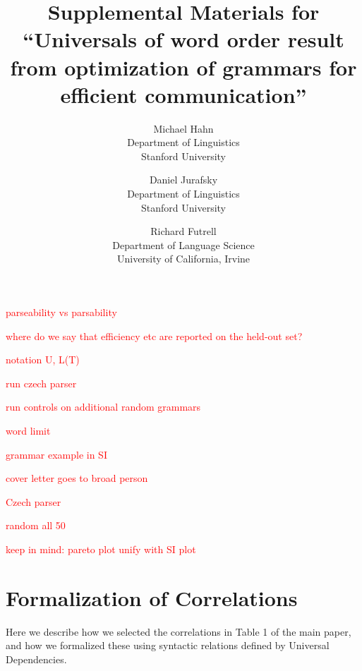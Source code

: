 \documentclass[10pt,twoside,lineno]{article}
\title{Supplemental Materials for ``Universals of word order result from optimization of grammars for efficient communication''}
\author{
        Michael Hahn \\
                Department of Linguistics\\
       Stanford University
            \and
       Daniel Jurafsky\\
       Department of Linguistics\\
       Stanford University \\
       \and
       Richard Futrell\\
       Department of Language Science\\
       University of California, Irvine
}
\begin{document}
\maketitle




\tableofcontents


\textcolor{red}{parseability vs parsability}

\textcolor{red}{where do we say that efficiency etc are reported on the held-out set?}

\textcolor{red}{notation U, L(T)}

\textcolor{red}{run czech parser}

\textcolor{red}{run controls on additional random grammars}


\textcolor{red}{word limit}

\textcolor{red}{grammar example in SI}

\textcolor{red}{cover letter goes to broad person}

\textcolor{red}{Czech parser}

\textcolor{red}{random all 50}

\textcolor{red}{keep in mind: pareto plot unify with SI plot}

\section{Formalization of Correlations}\label{sec:correlations}


Here we describe how we selected the correlations in Table 1 of the main paper, and how we formalized these using syntactic relations defined by Universal Dependencies.
\end{document}
